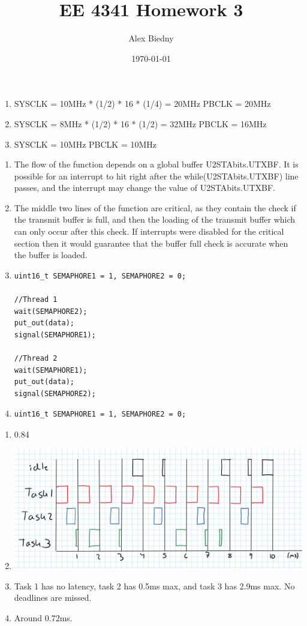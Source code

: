 \documentclass{jhwhw}
\title{EE 4341 Homework 3}
\author{Alex Biedny}
\date{\today}
\begin{document}
\maketitle

\problem{}
\begin{enumerate}
\item SYSCLK = 10MHz * (1/2) * 16 * (1/4) = 20MHz
PBCLK = 20MHz
\item SYSCLK = 8MHz * (1/2) * 16 * (1/2) = 32MHz
PBCLK = 16MHz
\item SYSCLK = 10MHz
PBCLK = 10MHz
\end{enumerate}

\problem{}
\begin{enumerate}
\item The flow of the function depends on a global buffer U2STAbits.UTXBF. It is possible for an interrupt to hit right after the while(U2STAbits.UTXBF) line passes, and the interrupt may change the value of U2STAbits.UTXBF.
\item The middle two lines of the function are critical, as they contain the check if the transmit buffer is full, and then the loading of the transmit buffer which can only occur after this check. If interrupts were disabled for the critical section then it would guarantee that the buffer full check is accurate when the buffer is loaded.
\item \begin{verbatim}
uint16_t SEMAPHORE1 = 1, SEMAPHORE2 = 0;

//Thread 1
wait(SEMAPHORE2);
put_out(data);
signal(SEMAPHORE1);

//Thread 2
wait(SEMAPHORE1);
put_out(data);
signal(SEMAPHORE2);
\end{verbatim}
\item \begin{verbatim}
uint16_t SEMAPHORE1 = 1, SEMAPHORE2 = 0;
\end{verbatim}
\end{enumerate}

\problem{}
\begin{enumerate}
\item 0.84
\item \includegraphics[scale=0.50]{HW3-1.jpg}
\item Task 1 has no latency, task 2 has 0.5ms max, and task 3 has 2.9ms max. No deadlines are missed.
\item Around 0.72ms.
\end{enumerate}
\end{document}
